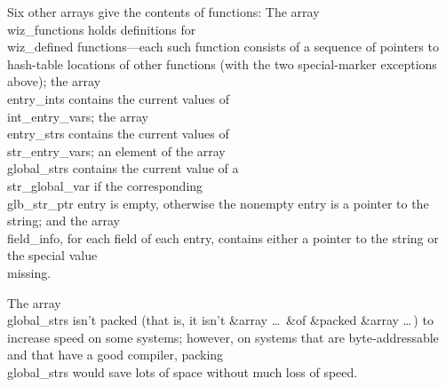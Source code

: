 Six other arrays give the contents of functions: The array
\\{wiz\_functions} holds definitions for \\{wiz\_defined} functions---each
such function consists of a sequence of pointers to hash-table
locations of other functions (with the two special-marker exceptions
above); the array \\{entry\_ints} contains the current values of
\\{int\_entry\_var}s; the array \\{entry\_strs} contains the current values
of \\{str\_entry\_var}s; an element of the array \\{global\_strs} contains
the current value of a \\{str\_global\_var} if the corresponding
\\{glb\_str\_ptr} entry is empty, otherwise the nonempty entry is a
pointer to the string; and the array \\{field\_info}, for each field of
each entry, contains either a pointer to the string or the special
value \\{missing}.

The array \\{global\_strs} isn't packed (that is, it isn't \&{array}  \dots\
\&{of} \&{packed} \&{array}  \dots$\,$) to increase speed on some systems;
however, on systems that are byte-addressable and that have a good
compiler, packing \\{global\_strs} would save lots of space without much
loss of speed.


